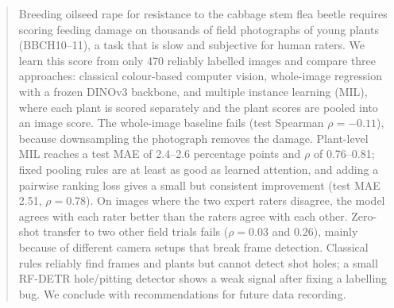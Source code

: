\begin{abstract}
Breeding oilseed rape for resistance to the cabbage stem flea beetle requires scoring feeding
damage on thousands of field photographs of young plants (BBCH10--11), a task that is slow and
subjective for human raters. We learn this score from only 470 reliably labelled images and
compare three approaches: classical colour-based computer vision, whole-image regression with a
frozen DINOv3 backbone, and multiple instance learning (MIL), where each plant is scored separately
and the plant scores are pooled into an image score. The whole-image baseline fails (test Spearman
$\rho = -0.11$), because downsampling the photograph removes the damage. Plant-level MIL reaches a
test MAE of 2.4--2.6 percentage points and $\rho$ of 0.76--0.81; fixed pooling rules are at least
as good as learned attention, and adding a pairwise ranking loss gives a small but consistent
improvement (test MAE 2.51, $\rho = 0.78$). On images where the two expert raters disagree, the
model agrees with each rater better than the raters agree with each other. Zero-shot transfer to
two other field trials fails ($\rho = 0.03$ and $0.26$), mainly because of different camera setups
that break frame detection. Classical rules reliably find frames and plants but cannot detect shot
holes; a small RF-DETR hole/pitting detector shows a weak signal after fixing a labelling bug. We
conclude with recommendations for future data recording.
\end{abstract}
